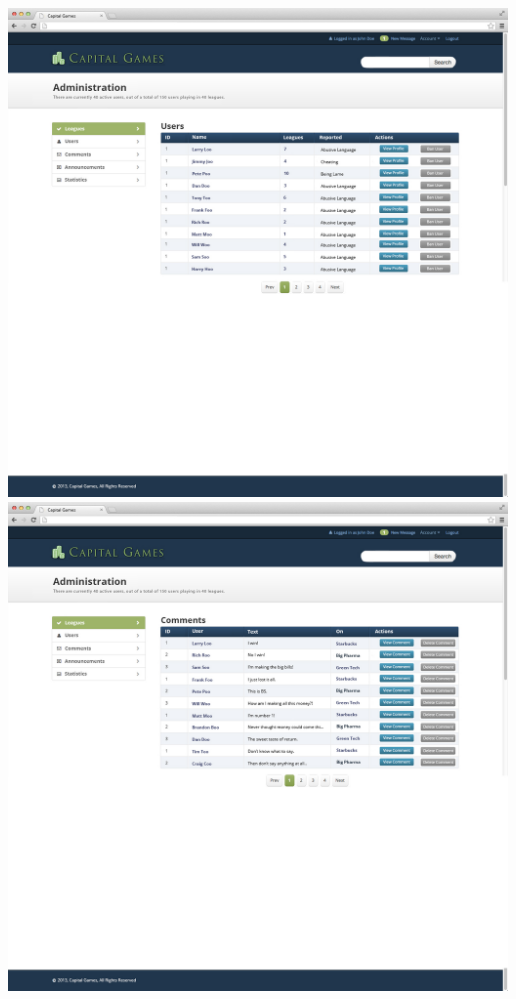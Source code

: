 \includegraphics[width=500px]{./mockups/JPEG/adminusers.jpg}
\includegraphics[width=500px]{./mockups/JPEG/admincomments.jpg}
